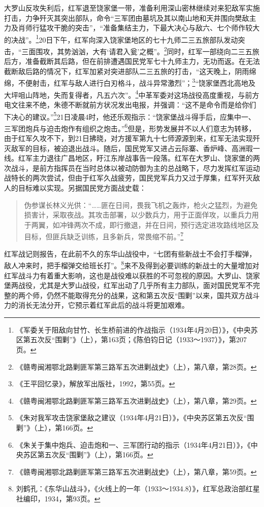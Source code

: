 大罗山反攻失利后，红军退至饶家堡一带，准备利用深山密林继续对来犯敌军实施打击，力争歼灭其突出部队，命令“三军团由墓坑及其以南山地和天井围向樊敌主力及肖师行猛攻干脆的突击”，“准备集结主力，下最大决心与敌六、七个师作较大的决战”。\footnote{《军委关于阻敌向甘竹、长生桥前进的作战指示（1934年4月20日）》，《中央苏区第五次反“围剿”》（上），第163页；《陈伯钧日记（1933～1937）》，第207页。}20日下午，红军向深入饶家堡地区的七十九师二三五旅部队发动突击，“三面围攻，其势汹汹，大有‘请君入瓮’之概”。\footnote{《赣粤闽湘鄂北路剿匪军第三路军五次进剿战史》（上），第八章，第28页。}同时，红军一部绕向二三五旅后方，准备截断其后路，但在前排遭遇国民党军七十九师主力，无功而返。在无法截断敌后路的情况下，红军加紧对突进部队二三五旅的打击，“这天晚上，阴雨绵绵，不便射击，红军与敌人进行白刃格斗，战斗异常激烈”；\footnote{《王平回忆录》，解放军出版社，1992，第55页。}“饶家堡西北高地及大坪咀山阵地，失而复得者，凡五六次”。\footnote{《赣粤闽湘鄂北路剿匪军第三路军五次进剿战史》（上），第八章，第29页。}中革军委对这场战役高度重视，与前方电文往来不绝，朱德不断就前方状况发出电报，并强调：“这不是命令而是给你们下决心的建议。”\footnote{《朱对我军攻击饶家堡敌之建议（1934年4月21日）》，《中央苏区第五次反“围剿”》（上），第166页。}21日凌晨4时，他还乐观指示：“饶家堡战斗得手后，应集中一、三军团炮兵与迫击炮作有组织之炮击。”\footnote{《朱关于集中炮兵、迫击炮和一、三军团行动的指示（1934年4月21日）》，《中央苏区第五次反“围剿”》（上），第166页。}但是，形势发展并不以人们意志为转移，由于红军久攻不下，到21日拂晓，对方援军第九十七师源源到来，红军无法实现歼灭敌军的目标，被迫退出战斗。随后，国民党军又进占云际寨、香炉峰、高洲瑕一线。红军主力退往广昌地区，盱江东岸战事告一段落。红军在大罗山、饶家堡的两次战斗，是前方指挥员在当时总体以被动防御为主的总战略下，尽力发挥红军运动战特长的两次尝试，但由于红军久战疲劳，国民党军兵力又过于厚集，红军歼灭敌人的目标难以实现。另据国民党方面战史载：

\begin{quote}

伪参谋长林义光供：“……匪在日间，畏我飞机之轰炸，枪火之猛烈，为避免损害计，采取夜战。其攻击部署，以少数兵力，用于正面佯攻，以重兵力用于两翼，如冲锋两次不成，即行撤退，并在日间，预行选定进攻路线地区及目标，但匪兵缺乏训练，且多新兵，常畏缩不前。”\footnote{《赣粤闽湘鄂北路剿匪军第三路军五次进剿战史》（上），第八章，第59页。}
\end{quote}


红军战记则报告，在此前不久的东华山战役中，“七团有些新战士不会打手榴弹，敌人冲来时，把手榴弹交给班长打”。\footnote{刘鹤孔：《东华山战斗》，《火线上的一年（1933～1934.8）》，红军总政治部红星社编印，1934，第93页。}来不及得到必要训练的新战士的大量增加对红军战斗力有着重大影响，这也是战役难以获胜的不可忽视的原因。大罗山、饶家堡两战役，尤其是大罗山战役，红军出动了几乎所有主力部队，面对国民党军不完整的两个师，仍然不能取得充分的战果，这和第五次反“围剿”以来，国共双方战斗力的消长无法分开，它预示着红军此后的战斗将更加艰难。


